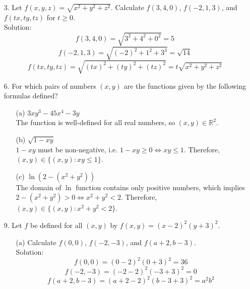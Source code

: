 \documentclass{article}
\begin{document}
\begin{enumerate}
    
    \item[3.] Let $f(x,y,z) = \sqrt{x^2 + y^2 + z^2}$. Calculate $f(3,4,0)$, $f(-2,1,3)$, and $f(tx,ty,tz)$ for $t \geq 0$. \\
    
    Solution:
    $$ f(3,4,0) = \sqrt{3^2 + 4^2 +0^2} = 5 $$
    $$ f(-2,1,3) = \sqrt{(-2)^2 + 1^2 + 3^3} = \sqrt{14} $$
    $$ f(tx, ty, tz) = \sqrt{(tx)^2 + (ty)^2 + (tz)^2} = t\sqrt{x^2+y^2+z^2} $$
    
    \item[6.] For which pairs of numbers $(x,y)$ are the functions given by the following formulas defined?
    
        \begin{enumerate}
            \item[(a)] $3xy^3 - 45x^4 - 3y$ \\
            
            The function is well-defined for all real numbers, so $(x,y) \in \mathbb{R}^2$.\\
            
            \item[(b)] $\sqrt{1 - xy}$ \\
            
            $1-xy$ must be non-negative, i.e. $ 1 - xy \geq 0 \Leftrightarrow xy \leq 1$. Therefore, $(x,y) \in \{(x,y): xy \leq 1\}$.\\
            
            \item[(c)] $\ln{(2 - (x^2 + y^2))}$ \\
            
            The domain of $\ln{}$ function contains only positive numbers, which implies $2 - (x^2 + y^2) > 0 \Leftrightarrow x^2 + y^2 < 2$. Therefore, $(x,y) \in \{ (x,y): x^2 + y^2 < 2 \}$.
            
        \end{enumerate}
    
    \item[9. ] Let $f$ be defined for all $(x,y)$ by $f(x,y)=(x-2)^2(y+3)^2$.
        \begin{enumerate}
            \item[(a)] Calculate $f(0, 0)$, $f(-2, -3)$, and $f(a + 2, b - 3)$. \\
            
            Solution: 
            $$ f(0,0) = (0-2)^2(0+3)^2 = 36 $$
            $$ f(-2,-3) = (-2-2)^2(-3+3)^2 = 0 $$
            $$ f(a+2,b-3) = (a+2-2)^2(b-3+3)^2 = a^2b^2 $$
            

\end{enumerate}
\end{enumerate}
\end{document}
